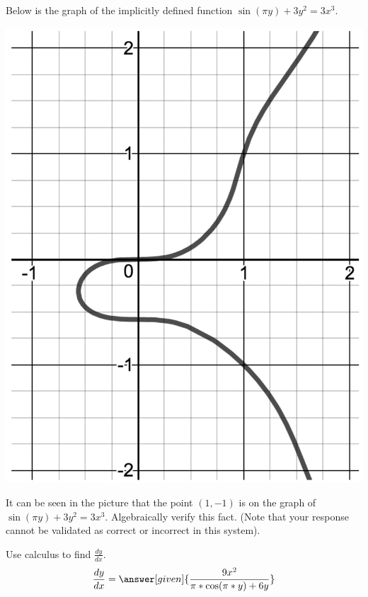 \documentclass[handout]{ximera}
\begin{document}
\begin{problem}
Below is the graph of the implicitly defined function $\displaystyle\sin \left(\pi y\right)+3y^2=3x^3$. 

\includegraphics[scale=0.4]{Exam2-ImpDiff2.png}


	\begin{question}
	It can be seen in the picture that the point $(1,-1)$ is on the graph of $\displaystyle\sin \left(\pi y\right)+3y^2=3x^3$. Algebraically verify this fact. (Note that your response cannot be validated as correct or incorrect in this system).\\
    \begin{freeResponse}
    \end{freeResponse}
    \end{question}
    
	
	\begin{question}
    Use calculus to find $\displaystyle\frac{dy}{dx}$.\\
    
    \[
    \displaystyle \dfrac{dy}{dx} = \answer[given]{\dfrac{9x^2}{\pi *\cos(\pi*y) + 6y}}
    \]
    \end{question}
    


\end{problem}
\end{document}
